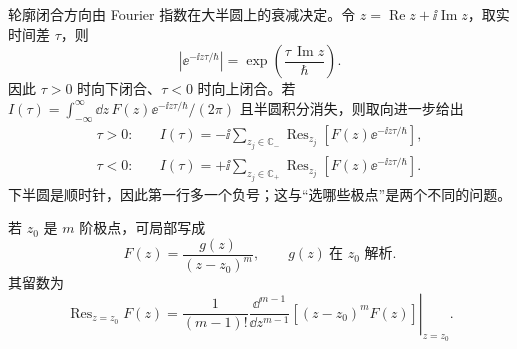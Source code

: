 轮廓闭合方向由 Fourier 指数在大半圆上的衰减决定。令 $z=\operatorname{Re}z+\ii\operatorname{Im}z$，取实时间差 $\tau$，则
\begin{equation}
 {
 \left|\ee^{-\ii z\tau/\hbar}\right|
 =\exp\!\left(\frac{\tau\,\operatorname{Im}z}{\hbar}\right).}
 \label{eq:jordan-exponential-r13}
\end{equation}
因此 $\tau>0$ 时向下闭合、$\tau<0$ 时向上闭合。若
$I(\tau)=\int_{-\infty}^{\infty}\dd z\,F(z)\ee^{-\ii z\tau/\hbar}/(2\pi)$
且半圆积分消失，则取向进一步给出
\begin{equation}
 {
 \begin{aligned}
 \tau>0:&\quad
 I(\tau)=-\ii\sum_{z_j\in\mathbb C_-}
 \operatorname{Res}_{z_j}[F(z)\ee^{-\ii z\tau/\hbar}],\\
 \tau<0:&\quad
 I(\tau)=+\ii\sum_{z_j\in\mathbb C_+}
 \operatorname{Res}_{z_j}[F(z)\ee^{-\ii z\tau/\hbar}].
 \end{aligned}}
 \label{eq:contour-orientation-residue-dp68}
\end{equation}
下半圆是顺时针，因此第一行多一个负号；这与“选哪些极点”是两个不同的问题。

若 $z_0$ 是 $m$ 阶极点，可局部写成
\begin{equation}
 {F(z)=\frac{g(z)}{(z-z_0)^m},\qquad g(z)\ \text{在 }z_0\text{ 解析}.}
 \label{eq:higher-pole-local-form-dp68}
\end{equation}
其留数为
\begin{equation}
 {
 \operatorname{Res}_{z=z_0}F(z)
 =\frac1{(m-1)!}
 \left.\frac{\dd^{m-1}}{\dd z^{m-1}}
 [(z-z_0)^mF(z)]\right|_{z=z_0}.}
 \label{eq:higher-pole-residue-dp68}
\end{equation}
